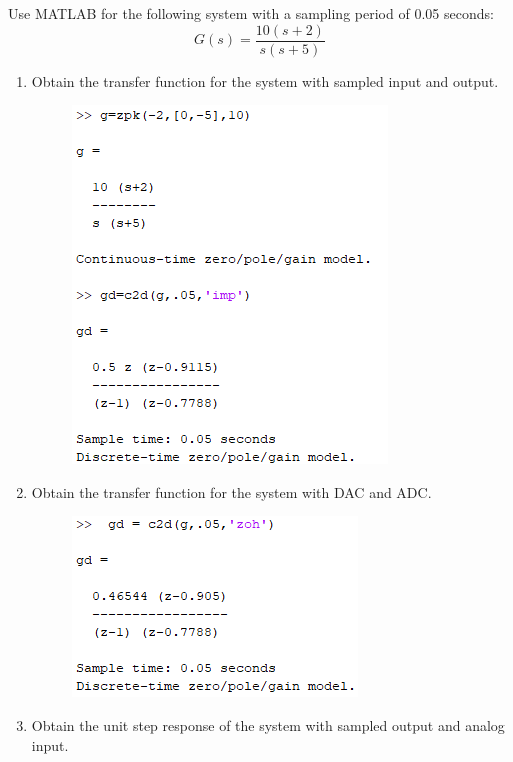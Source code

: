 \documentclass[12pt]{article}
\newenvironment{problem}[2][Problem]{\begin{trivlist}
\item[\hskip \labelsep {\bfseries #1}\hskip \labelsep {\bfseries #2.}]}{\end{trivlist}}
\begin{document}
\begin{problem}{2}
    Use MATLAB for the following system with a sampling period of 0.05 seconds:
    $$G(s) = \frac{10(s+2)}{s(s+5)}$$
    \begin{enumerate}[label=(\alph*)]
        \item Obtain the transfer function for the system with sampled input and output.
        \begin{figure}[H]
            \centering
            \includegraphics{2a}
        \end{figure}
        \item Obtain the transfer function for the system with DAC and ADC.
        \begin{figure}[H]
            \centering
            \includegraphics{2b}
        \end{figure}
        \pagebreak
        \item Obtain the unit step response of the system with sampled output and analog input.
        \begin{figure}[H]
            \centering

\end{figure}
\end{enumerate}
\end{problem}
\end{document}
